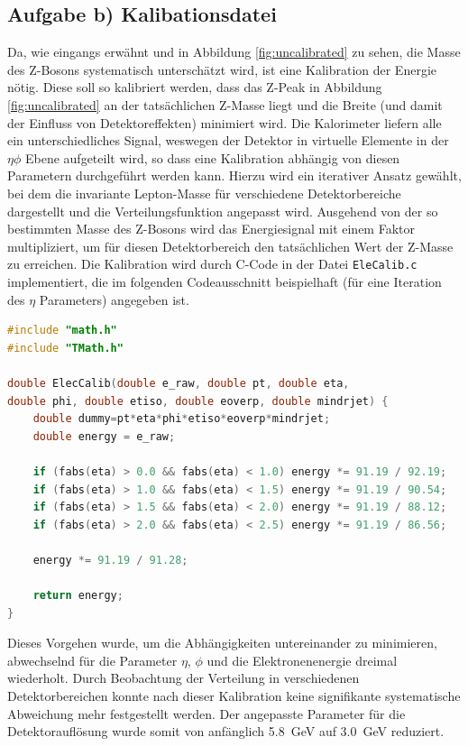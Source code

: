 \documentclass[11pt, a4paper]{article}
\numberwithin{equation}{section}
\begin{document}
\subsection{Aufgabe b) Kalibationsdatei}

Da, wie eingangs erwähnt und in Abbildung \ref{fig:uncalibrated} zu sehen, die Masse des Z-Bosons systematisch unterschätzt wird, ist eine Kalibration der Energie nötig.
Diese soll so kalibriert werden, dass das Z-Peak in Abbildung \ref{fig:uncalibrated} an der tatsächlichen Z-Masse liegt und die Breite (und damit der Einfluss von Detektoreffekten) minimiert wird.
Die Kalorimeter liefern alle ein unterschiedliches Signal, weswegen der Detektor in virtuelle Elemente in der $\eta\phi$ Ebene aufgeteilt wird, so dass eine Kalibration abhängig von diesen Parametern durchgeführt werden kann.
Hierzu wird ein iterativer Ansatz gewählt, bei dem die invariante Lepton-Masse für verschiedene Detektorbereiche dargestellt und die Verteilungsfunktion angepasst wird.
Ausgehend von der so bestimmten Masse des Z-Bosons wird das Energiesignal mit einem Faktor multipliziert, um für diesen Detektorbereich den tatsächlichen Wert der Z-Masse zu erreichen.
Die Kalibration wird durch C-Code in der Datei \texttt{EleCalib.c} implementiert, die im folgenden Codeausschnitt beispielhaft (für eine Iteration des $\eta$ Parameters) angegeben ist.
\begin{lstlisting}[language=C]
#include "math.h"
#include "TMath.h"

double ElecCalib(double e_raw, double pt, double eta, 
double phi, double etiso, double eoverp, double mindrjet) {
	double dummy=pt*eta*phi*etiso*eoverp*mindrjet;
	double energy = e_raw;
	
	if (fabs(eta) > 0.0 && fabs(eta) < 1.0) energy *= 91.19 / 92.19;
	if (fabs(eta) > 1.0 && fabs(eta) < 1.5) energy *= 91.19 / 90.54;
	if (fabs(eta) > 1.5 && fabs(eta) < 2.0) energy *= 91.19 / 88.12;
	if (fabs(eta) > 2.0 && fabs(eta) < 2.5) energy *= 91.19 / 86.56;
	
	energy *= 91.19 / 91.28;
	
	return energy;
} 
\end{lstlisting}
Dieses Vorgehen wurde, um die Abhängigkeiten untereinander zu minimieren, abwechselnd für die Parameter $\eta$, $\phi$ und die Elektronenenergie dreimal wiederholt.
Durch Beobachtung der Verteilung in verschiedenen Detektorbereichen konnte nach dieser Kalibration keine signifikante systematische Abweichung mehr festgestellt werden.
Der angepasste Parameter für die Detektorauflösung wurde somit von anfänglich \SI{5.8}{GeV} auf \SI{3.0}{GeV} reduziert.
\end{document}
